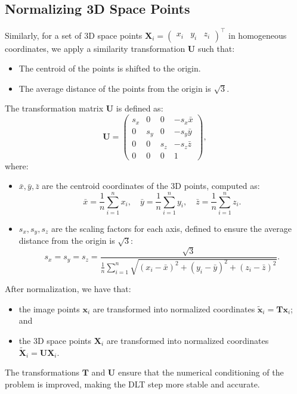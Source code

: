 \documentclass[12pt]{article}
\begin{document}
\subsection{Normalizing 3D Space Points}
Similarly, for a set of 3D space points \( \mathbf{X}_i = \begin{pmatrix} x_i & y_i & z_i \end{pmatrix}^\top \) in homogeneous coordinates, we apply a similarity transformation \( \mathbf{U} \) such that:
\begin{itemize}
    \item The centroid of the points is shifted to the origin.
    \item The average distance of the points from the origin is \(\sqrt{3}\).
\end{itemize}

The transformation matrix \( \mathbf{U} \) is defined as:
$$
\mathbf{U} = 
\begin{pmatrix} 
s_x & 0 & 0 & -s_x \bar{x} \\
0 & s_y & 0 & -s_y \bar{y} \\
0 & 0 & s_z & -s_z \bar{z} \\
0 & 0 & 0 & 1
\end{pmatrix},
$$
where:
\begin{itemize}
    \item \( \bar{x}, \bar{y}, \bar{z} \) are the centroid coordinates of the 3D points, computed as:
    $$
    \bar{x} = \frac{1}{n} \sum_{i=1}^n x_i, \quad \bar{y} = \frac{1}{n} \sum_{i=1}^n y_i, \quad \bar{z} = \frac{1}{n} \sum_{i=1}^n z_i.
    $$
    \item \( s_x, s_y, s_z \) are the scaling factors for each axis, defined to ensure the average distance from the origin is \(\sqrt{3}\):
    $$
    s_x = s_y = s_z = \frac{\sqrt{3}}{\displaystyle\frac{1}{n} \sum_{i=1}^n \sqrt{(x_i - \bar{x})^2 + (y_i - \bar{y})^2 + (z_i - \bar{z})^2}}.
    $$
\end{itemize}

After normalization, we have that:
\begin{itemize}
    \item the image points \( \mathbf{x}_i \) are transformed into normalized coordinates \( \tilde{\mathbf{x}}_i = \mathbf{T} \mathbf{x}_i \); and
    \item the 3D space points \( \mathbf{X}_i \) are transformed into normalized coordinates \( \tilde{\mathbf{X}}_i = \mathbf{U} \mathbf{X}_i \).
\end{itemize}
The transformations \( \mathbf{T} \) and \( \mathbf{U} \) ensure that the numerical conditioning of the problem is improved, making the DLT step more stable and accurate.
\end{document}

